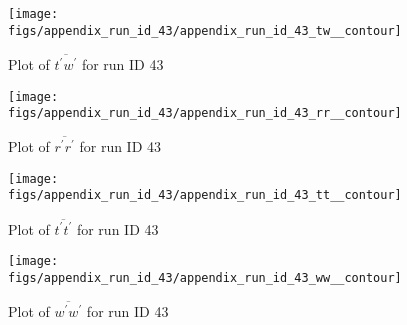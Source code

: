 \begin{figure}[H]
\centering
\texttt{[image: figs/appendix\_run\_id\_43/appendix\_run\_id\_43\_tw\_\_contour]}
\caption{Plot of $\overline{t^\prime w^\prime}$ for run ID 43}
\label{fig:appendix_run_id_43_tw__contour}
\end{figure}


\begin{figure}[H]
\centering
\texttt{[image: figs/appendix\_run\_id\_43/appendix\_run\_id\_43\_rr\_\_contour]}
\caption{Plot of $\overline{r^\prime r^\prime}$ for run ID 43}
\label{fig:appendix_run_id_43_rr__contour}
\end{figure}


\begin{figure}[H]
\centering
\texttt{[image: figs/appendix\_run\_id\_43/appendix\_run\_id\_43\_tt\_\_contour]}
\caption{Plot of $\overline{t^\prime t^\prime}$ for run ID 43}
\label{fig:appendix_run_id_43_tt__contour}
\end{figure}


\begin{figure}[H]
\centering
\texttt{[image: figs/appendix\_run\_id\_43/appendix\_run\_id\_43\_ww\_\_contour]}
\caption{Plot of $\overline{w^\prime w^\prime}$ for run ID 43}
\label{fig:appendix_run_id_43_ww__contour}
\end{figure}


